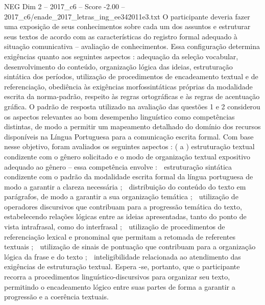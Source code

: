 \begin{textsample}{NEG Dim 2 – 2017\_c6 – Score -2.00 – 2017\_c6/enade\_2017\_letras\_ing\_ee342011e3.txt}
O participante deveria fazer uma exposição de seus conhecimentos sobre cada um dos assuntos e estruturar seus textos de acordo com as características do registro formal adequado à situação comunicativa – avaliação de conhecimentos.
Essa configuração determina exigências quanto aos seguintes aspectos : adequação da seleção vocabular, desenvolvimento do conteúdo, organização lógica das ideias, estruturação sintática dos períodos, utilização de procedimentos de encadeamento textual e de referenciação, obediência às exigências morfossintáticas próprias da modalidade escrita da norma-padrão, respeito às regras ortográficas e às regras de acentuação gráfica.
O padrão de resposta utilizado na avaliação das questões 1 e 2 considerou os aspectos relevantes ao bom desempenho linguístico como competências distintas, de modo a permitir um mapeamento detalhado do domínio dos recursos disponíveis na Língua Portuguesa para a comunicação escrita formal.
Com base nesse objetivo, foram avaliados os seguintes aspectos : ( a ) estruturação textual condizente com o gênero solicitado e o modo de organização textual expositivo adequado ao gênero – essa competência envolve :  estruturação sintática condizente com o padrão da modalidade escrita formal da língua portuguesa de modo a garantir a clareza necessária ;  distribuição do conteúdo do texto em parágrafos, de modo a garantir a sua organização temática ;  utilização de operadores discursivos que contribuam para a progressão temática do texto, estabelecendo relações lógicas entre as ideias apresentadas, tanto do ponto de vista intrafrasal, como do interfrasal ;  utilização de procedimentos de referenciação lexical e pronominal que permitam a retomada de referentes textuais ;  utilização de sinais de pontuação que contribuam para a organização lógica da frase e do texto ;  inteligibilidade relacionada ao atendimento das exigências de estruturação textual.
Espera -se, portanto, que o participante recorra a procedimentos linguístico-discursivos para organizar seu texto, permitindo o encadeamento lógico entre suas partes de forma a garantir a progressão e a coerência textuais.

\end{textsample}
